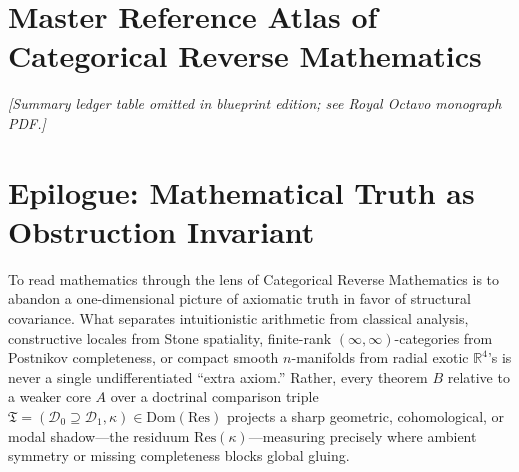 \section{Master Reference Atlas of Categorical Reverse Mathematics}

\begin{center}\emph{[Summary ledger table omitted in blueprint edition; see Royal Octavo monograph PDF.]}\end{center}

\section{Epilogue: Mathematical Truth as Obstruction Invariant}\label{sec:epilogue-truth}

To read mathematics through the lens of Categorical Reverse Mathematics is to abandon a one-dimensional picture of axiomatic truth in favor of structural covariance. What separates intuitionistic arithmetic from classical analysis, constructive locales from Stone spatiality, finite-rank $(\infty,\infty)$-categories from Postnikov completeness, or compact smooth $n$-manifolds from radial exotic $\mathbb{R}^4$'s is never a single undifferentiated ``extra axiom.'' Rather, every theorem $B$ relative to a weaker core $A$ over a doctrinal comparison triple $\mathfrak{T} = (\mathcal{D}_0 \supseteq \mathcal{D}_1, \kappa) \in \mathrm{Dom}(\mathrm{Res})$ projects a sharp geometric, cohomological, or modal shadow---the residuum $\mathrm{Res}(\kappa)$---measuring precisely where ambient symmetry or missing completeness blocks global gluing.

